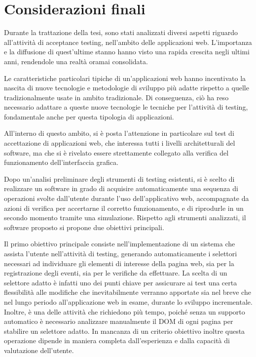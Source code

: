 \documentclass[12pt]{toptesi}
\begin{document}
\author{Fabio Sussetto}

\frontespizio

\indici













\chapter{Considerazioni finali}

Durante la trattazione della tesi, sono stati analizzati diversi aspetti riguardo all'attività di acceptance testing, nell'ambito delle applicazioni web. L'importanza e la diffusione di quest'ultime stanno hanno visto una rapida crescita negli ultimi anni, rendendole una realtà oramai consolidata. 

Le caratteristiche particolari tipiche di un'applicazioni web hanno incentivato la nascita di nuove tecnologie e metodologie di sviluppo più adatte rispetto a quelle tradizionalmente usate in ambito tradizionale. Di conseguenza, ciò ha reso necessario adattare a queste nuove tecnologie le tecniche per l'attività di testing, fondamentale anche per questa tipologia di applicazioni.

All'interno di questo ambito, si è posta l'attenzione in particolare sul test di accettazione di applicazioni web, che interessa tutti i livelli architetturali del software, ma che si è rivelato essere strettamente collegato alla verifica del funzionamento dell'interfaccia grafica.

Dopo un'analisi preliminare degli strumenti di testing esistenti, si è scelto di realizzare un software in grado di acquisire automaticamente una sequenza di operazioni svolte dall'utente durante l'uso dell'applicativo web, accompagnate da azioni di verifica per accertarne il corretto funzionamento, e di riprodurle in un secondo momento tramite una simulazione. Rispetto agli strumenti analizzati, il software proposto si propone due obiettivi principali. 

Il primo obiettivo principale consiste nell'implementazione di un sistema che assista l'utente nell'attività di testing, generando automaticamente i selettori necessari ad individuare gli elementi di interesse della pagina web, sia per la registrazione degli eventi, sia per le verifiche da effettuare. La scelta di un selettore adatto è infatti uno dei punti chiave per assicurare ai test una certa flessibilità alle modifiche che inevitabilmente verranno apportate sia nel breve che nel lungo periodo all'applicazione web in esame, durante lo sviluppo incrementale. Inoltre, è una delle attività che richiedono più tempo, poiché senza un supporto automatico è necessario analizzare manualmente il DOM di ogni pagina per stabilire un selettore adatto. In mancanza di un criterio obiettivo inoltre questa operazione dipende in maniera completa dall'esperienza e dalla capacità di valutazione dell'utente.
\end{document}
